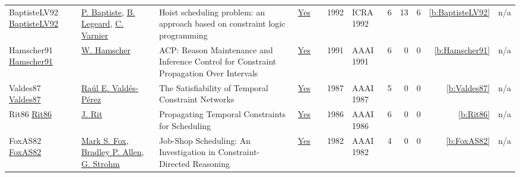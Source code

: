 {\begin{longtable}{>{\raggedright\arraybackslash}p{3cm}>{\raggedright\arraybackslash}p{6cm}>{\raggedright\arraybackslash}p{6.5cm}rrrp{2.5cm}rrrrr}
BaptisteLV92 \href{https://doi.org/10.1109/ROBOT.1992.220195}{BaptisteLV92} & \hyperref[auth:a699]{P. Baptiste}, \hyperref[auth:a700]{B. Legeard}, \hyperref[auth:a698]{C. Varnier} & Hoist scheduling problem: an approach based on constraint logic programming & \href{../works/BaptisteLV92.pdf}{Yes} & \cite{BaptisteLV92} & 1992 & ICRA 1992 & 6 & 13 & 6 & \ref{b:BaptisteLV92} & n/a\\
Hamscher91 \href{http://www.aaai.org/Library/AAAI/1991/aaai91-079.php}{Hamscher91} & \hyperref[auth:a1299]{W. Hamscher} & {ACP:} Reason Maintenance and Inference Control for Constraint Propagation Over Intervals & \href{../works/Hamscher91.pdf}{Yes} & \cite{Hamscher91} & 1991 & AAAI 1991 & 6 & 0 & 0 & \ref{b:Hamscher91} & n/a\\
Valdes87 \href{http://www.aaai.org/Library/AAAI/1987/aaai87-046.php}{Valdes87} & \hyperref[auth:a1296]{Ra{\'{u}}l E. Vald{\'{e}}s{-}P{\'{e}}rez} & The Satisfiability of Temporal Constraint Networks & \href{../works/Valdes87.pdf}{Yes} & \cite{Valdes87} & 1987 & AAAI 1987 & 5 & 0 & 0 & \ref{b:Valdes87} & n/a\\
Rit86 \href{http://www.aaai.org/Library/AAAI/1986/aaai86-064.php}{Rit86} & \hyperref[auth:a1295]{J. Rit} & Propagating Temporal Constraints for Scheduling & \href{../works/Rit86.pdf}{Yes} & \cite{Rit86} & 1986 & AAAI 1986 & 6 & 0 & 0 & \ref{b:Rit86} & n/a\\
FoxAS82 \href{http://www.aaai.org/Library/AAAI/1982/aaai82-037.php}{FoxAS82} & \hyperref[auth:a304]{Mark S. Fox}, \hyperref[auth:a1018]{Bradley P. Allen}, \hyperref[auth:a1019]{G. Strohm} & Job-Shop Scheduling: An Investigation in Constraint-Directed Reasoning & \href{../works/FoxAS82.pdf}{Yes} & \cite{FoxAS82} & 1982 & AAAI 1982 & 4 & 0 & 0 & \ref{b:FoxAS82} & n/a\\
\end{longtable}
}

